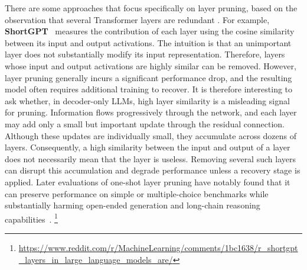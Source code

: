 There are some approaches that focus specifically on layer pruning, 
based on the observation that several Transformer layers are redundant \citep{men2024shortgpt, yang2024laco}.
For example, \textbf{ShortGPT}~\citep{men2024shortgpt} measures the contribution 
of each layer using the cosine similarity between its input and output activations. 
The intuition is that an unimportant layer does not substantially modify 
its input representation. Therefore, layers whose input and output activations 
are highly similar can be removed. However, layer pruning generally
incurs a significant performance drop, and the resulting model often requires 
additional training to recover. It is therefore interesting to ask whether, 
in decoder-only LLMs, high layer similarity is a misleading signal for pruning. 
Information flows progressively through the network, and each layer may add only 
a small but important update through the residual connection. 
Although these updates are individually small, they accumulate across dozens 
of layers. Consequently, a high similarity between the input and output of a 
layer does not necessarily mean that the layer is useless. 
Removing several such layers can disrupt this accumulation and degrade 
performance unless a recovery stage is applied. Later evaluations of one-shot 
layer pruning have notably found that it can preserve performance on simple or 
multiple-choice benchmarks while substantially harming open-ended generation 
and long-chain reasoning capabilities~\citep{wang2025fewerlayers,he2026pop}.
\footnote{
    \url{https://www.reddit.com/r/MachineLearning/comments/1bc1638/r_shortgpt_layers_in_large_language_models_are/}
}

